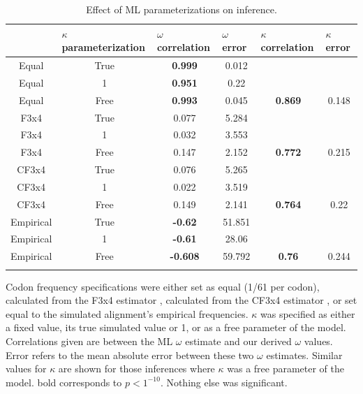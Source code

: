 \documentclass[11pt]{article}
\begin{document}
\begin{table}[htbp]
\caption {\label{tab:mlspec}Effect of ML parameterizations on inference.}
\begin{tabular}{c c c c c c}
\hline\noalign{\smallskip}
\multicolumn{1}{l}{Codon frequencies} & \multicolumn{1}{l}{$\kappa$ parameterization} & \multicolumn{1}{l}{$\omega$ correlation} &\multicolumn{1}{l}{$\omega$ error} & \multicolumn{1}{l}{$\kappa$ correlation} &\multicolumn{1}{l}{$\kappa$ error} \\
\hline\noalign{\smallskip}
Equal & True & \textbf{0.999} & 0.012 &   &   \\ 
Equal & 1 & \textbf{0.951} & 0.22 &   &   \\ 
Equal & Free & \textbf{0.993} & 0.045 & \textbf{0.869} & 0.148 \\ 
F3x4 & True & 0.077 & 5.284 &   &   \\ 
F3x4 & 1 & 0.032 & 3.553 &   &   \\ 
F3x4 & Free & 0.147 & 2.152 & \textbf{0.772} & 0.215 \\ 
CF3x4 & True & 0.076 & 5.265 &   &   \\ 
CF3x4 & 1 & 0.022 & 3.519 &   &   \\ 
CF3x4 & Free & 0.149 & 2.141 & \textbf{0.764} & 0.22 \\ 
Empirical & True & \textbf{-0.62} & 51.851 &   &   \\ 
Empirical & 1 & \textbf{-0.61} & 28.06 &   &   \\ 
Empirical & Free & \textbf{-0.608} & 59.792 & \textbf{0.76} & 0.244 \\ 

\noalign{\smallskip}\hline\noalign{\smallskip}
\end{tabular}
\newline
Codon frequency specifications were either set as equal (1/61 per codon), calculated from the F3x4 estimator \cite{MuseGaut1994}, calculated from the CF3x4 estimator \cite{Pond2010}, or set equal to the simulated alignment's empirical frequencies. $\kappa$ was specified as either a fixed value, its true simulated value or 1, or as a free parameter of the model. Correlations given are between the ML $\omega$ estimate and our derived $\omega$ values. Error refers to the mean absolute error between these two $\omega$ estimates. Similar values for $\kappa$ are shown for those inferences where $\kappa$ was a free parameter of the model. bold corresponds to  $p < 1^{-10}$. Nothing else was significant.
\end{table}	
	
\end{document}
